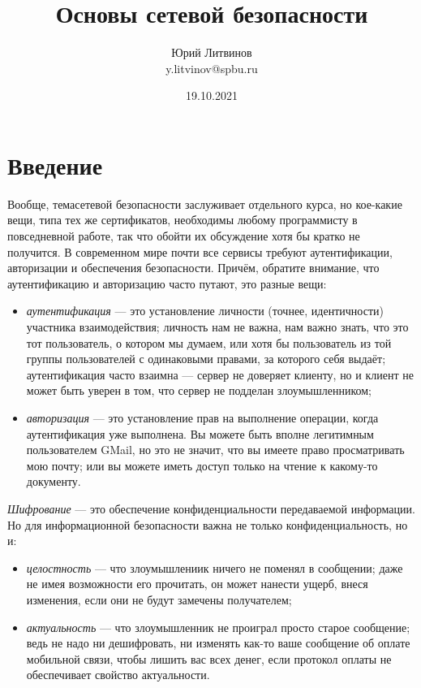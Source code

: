 \documentclass[a5paper]{article}
\title{Основы сетевой безопасности}
\author{Юрий Литвинов\\\small{y.litvinov@spbu.ru}}
\date{19.10.2021}
\begin{document}
\maketitle
\thispagestyle{empty}

\section{Введение}

Вообще, темасетевой безопасности заслуживает отдельного курса, но кое-какие вещи, типа тех же сертификатов, необходимы любому программисту в повседневной работе, так что обойти их обсуждение хотя бы кратко не получится. В современном мире почти все сервисы требуют аутентификации, авторизации и обеспечения безопасности. Причём, обратите внимание, что аутентификацию и авторизацию часто путают, это разные вещи:

\begin{itemize}
    \item \textit{аутентификация} --- это установление личности (точнее, идентичности) участника взаимодействия; личность нам не важна, нам важно знать, что это тот пользователь, о котором мы думаем, или хотя бы пользователь из той группы пользователей с одинаковыми правами, за которого себя выдаёт; аутентификация часто взаимна --- сервер не доверяет клиенту, но и клиент не может быть уверен в том, что сервер не подделан злоумышленником;
    \item \textit{авторизация} --- это установление прав на выполнение операции, когда аутентификация уже выполнена. Вы можете быть вполне легитимным пользователем GMail, но это не значит, что вы имеете право просматривать мою почту; или вы можете иметь доступ только на чтение к какому-то документу.
\end{itemize}

\textit{Шифрование} --- это обеспечение конфиденциальности передаваемой информации. Но для информационной безопасности важна не только конфиденциальность, но и:

\begin{itemize}
    \item \textit{целостность} --- что злоумышлениик ничего не поменял в сообщении; даже не имея возможности его прочитать, он может нанести ущерб, внеся изменения, если они не будут замечены получателем;
    \item \textit{актуальность} --- что злоумышленник не проиграл просто старое сообщение; ведь не надо ни дешифровать, ни изменять как-то ваше сообщение об оплате мобильной связи, чтобы лишить вас всех денег, если протокол оплаты не обеспечивает свойство актуальности.
\end{itemize} 
\end{document}
